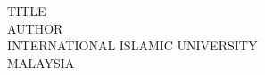 \begin{titlepage}

    
    \onehalfspacing
    
    \begin{center}
        {\fontsize{17pt}{20.4}\selectfont TITLE}\\[4em]
        {\fontsize{17pt}{20.4}\selectfont AUTHOR}\\[3.2cm]
        {\fontsize{17pt}{20.4}\selectfont INTERNATIONAL ISLAMIC UNIVERSITY\\MALAYSIA}\\[3.2cm]
        {\fontsize{17pt}{20.4}}
    \end{center}
    
\end{titlepage}